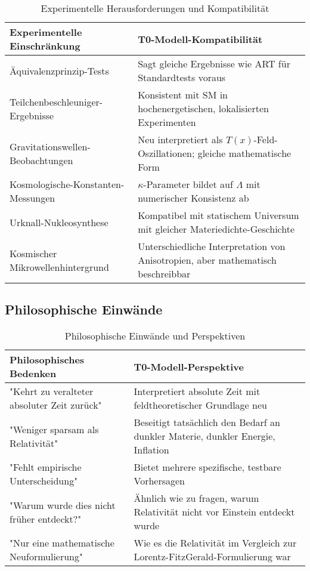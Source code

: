 \documentclass[12pt,a4paper]{article}
\newcommand{\Tfield}{T(x)}
\begin{document}
	\begin{table}[h]
		\centering
		\begin{tabular}{>{\RaggedRight}p{} >{\RaggedRight}p{}}
			\toprule
			\textbf{Experimentelle Einschränkung} & \textbf{T0-Modell-Kompatibilität} \\
			\midrule
			Äquivalenzprinzip-Tests & Sagt gleiche Ergebnisse wie ART für Standardtests voraus \\
			Teilchenbeschleuniger-Ergebnisse & Konsistent mit SM in hochenergetischen, lokalisierten Experimenten \\
			Gravitationswellen-Beobachtungen & Neu interpretiert als $\Tfield$-Feld-Oszillationen; gleiche mathematische Form \\
			Kosmologische-Konstanten-Messungen & $\kappa$-Parameter bildet auf $\Lambda$ mit numerischer Konsistenz ab \\
			Urknall-Nukleosynthese & Kompatibel mit statischem Universum mit gleicher Materiedichte-Geschichte \\
			Kosmischer Mikrowellenhintergrund & Unterschiedliche Interpretation von Anisotropien, aber mathematisch beschreibbar \\
			\bottomrule
		\end{tabular}
		\caption{Experimentelle Herausforderungen und Kompatibilität}
	\end{table}
	
	\subsection{Philosophische Einwände}
	
	\begin{table}[h]
		\centering
		\begin{tabular}{>{\RaggedRight}p{} >{\RaggedRight}p{}}
			\toprule
			\textbf{Philosophisches Bedenken} & \textbf{T0-Modell-Perspektive} \\
			\midrule
			"Kehrt zu veralteter absoluter Zeit zurück" & Interpretiert absolute Zeit mit feldtheoretischer Grundlage neu \\
			"Weniger sparsam als Relativität" & Beseitigt tatsächlich den Bedarf an dunkler Materie, dunkler Energie, Inflation \\
			"Fehlt empirische Unterscheidung" & Bietet mehrere spezifische, testbare Vorhersagen \\
			"Warum wurde dies nicht früher entdeckt?" & Ähnlich wie zu fragen, warum Relativität nicht vor Einstein entdeckt wurde \\
			"Nur eine mathematische Neuformulierung" & Wie es die Relativität im Vergleich zur Lorentz-FitzGerald-Formulierung war \\
			\bottomrule
		\end{tabular}
		\caption{Philosophische Einwände und Perspektiven}
	\end{table}
	
\end{document}
